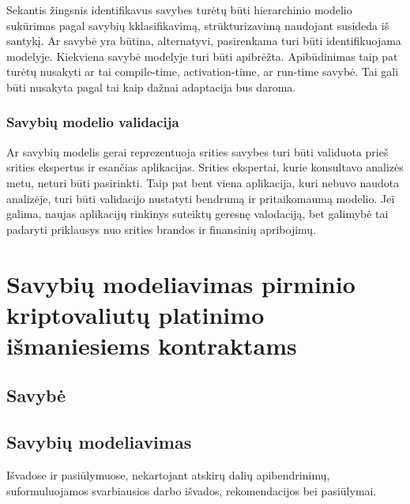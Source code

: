\documentclass{VUMIFPSkursinis}
\begin{document}
Sekantis žingsnis identifikavus savybes turėtų būti hierarchinio modelio sukūrimas pagal savybių kklasifikavimą, strūkturizavimą naudojant susideda iš santykį. Ar savybė yra būtina, alternatyvi, pasirenkama turi būti identifikuojama modelyje. Kiekviena savybė modelyje turi būti apibrėžta. Apibūdinimas taip pat turėtų nusakyti ar tai compile-time, activation-time,  ar run-time savybė. Tai gali būti nusakyta pagal tai kaip dažnai adaptacija bus daroma.

\subsubsection{Savybių modelio validacija}
Ar savybių modelis gerai reprezentuoja srities savybes turi būti validuota prieš srities ekspertus ir esančias aplikacijas. Srities ekspertai, kurie konsultavo analizės metu, neturi būti pasirinkti.  Taip pat bent viena aplikacija, kuri nebuvo naudota analizėje, turi būti validacijo nustatyti bendrumą ir pritaikomaumą modelio. Jei galima, naujas aplikacijų rinkinys suteiktų geresnę valodaciją, bet galimybė tai padaryti priklausys nuo srities brandos ir finansinių apribojimų. 
 


\section{Savybių modeliavimas pirminio kriptovaliutų platinimo išmaniesiems kontraktams}
\subsection{Savybė}
\subsection{Savybių modeliavimas}








Išvadose ir pasiūlymuose, nekartojant atskirų dalių apibendrinimų,
suformuluojamos svarbiausios darbo išvados, rekomendacijos bei pasiūlymai.



\printbibliography[heading=bibintoc] %
\end{document}
